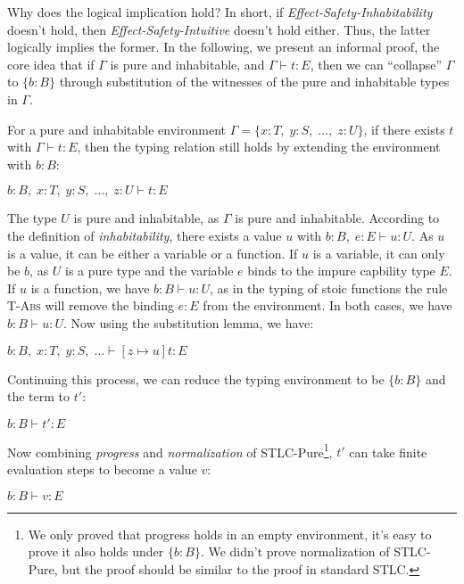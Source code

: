 Why does the logical implication hold? In short, if
\emph{Effect-Safety-Inhabitability} doesn't hold, then
\emph{Effect-Safety-Intuitive} doesn't hold either. Thus, the latter
logically implies the former.  In the following, we present an
informal proof, the core idea that if $\Gamma$ is pure and
inhabitable, and $\Gamma \vdash t : E$, then we can ``collapse''
$\Gamma$ to $\{b : B\}$ through substitution of the witnesses of the
pure and inhabitable types in $\Gamma$.

For a pure and inhabitable environment
$\Gamma = \{x:T, \; y:S, \; \dots, \; z:U\}$, if there exists $t$ with
$\Gamma \vdash t : E$, then the typing relation still holds by
extending the environment with $b:B$:

\begin{center}
$b:B, \; x:T, \; y:S, \; \dots, \; z:U \vdash t: E$
\end{center}

The type $U$ is pure and inhabitable, as $\Gamma$ is pure and
inhabitable. According to the definition of \emph{inhabitability},
there exists a value $u$ with $b:B, \; e:E \vdash u: U$. As $u$ is a
value, it can be either a variable or a function. If $u$ is a
variable, it can only be $b$, as $U$ is a pure type and the variable
$e$ binds to the impure capbility type $E$. If $u$ is a function, we
have $b:B \vdash u: U$, as in the typing of stoic functions the rule
\textsc{T-Abs} will remove the binding $e:E$ from the environment. In
both cases, we have $b:B \vdash u: U$. Now using the substitution
lemma, we have:

\begin{center}
$b:B, \; x:T, \; y:S, \; \dots \vdash [z \mapsto u]t: E$
\end{center}

Continuing this process, we can reduce the typing environment to be
$\{b:B\}$ and the term to $t'$:

\begin{center}
$b:B \vdash t': E$
\end{center}

Now combining \emph{progress} and \emph{normalization} of
STLC-Pure\footnote{We only proved that progress holds in an empty
  environment, it's easy to prove it also holds under $\{b:B\}$. We
  didn't prove normalization of STLC-Pure, but the proof should be
  similar to the proof in standard STLC.}, $t'$ can take finite
evaluation steps to become a value $v$:

\begin{center}
$b:B \vdash v: E$
\end{center}

